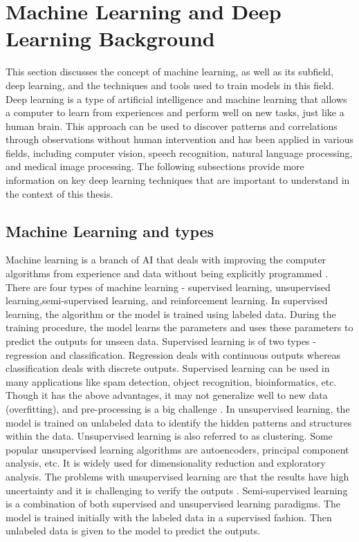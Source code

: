 \documentclass{book}
\begin{document}
	\section{Machine Learning and Deep Learning Background}
	This section discusses the concept of machine learning, as well as its subfield, deep learning, and the techniques and tools used to train models in this field. Deep learning is a type of artificial intelligence and machine learning that allows a computer to learn from experiences and perform well on new tasks, just like a human brain. This approach can be used to discover patterns and correlations through observations without human intervention and has been applied in various fields, including computer vision, speech recognition, natural language processing, and medical image processing. The following subsections provide more information on key deep learning techniques that are important to understand in the context of this thesis.
	
	\subsection{Machine Learning and types}
	Machine learning is a branch of AI that deals with improving the computer algorithms from experience and data without being explicitly programmed \cite{koza1996automated}. There	are four types of machine learning - supervised learning, unsupervised learning,semi-supervised learning, and reinforcement learning.
	In supervised learning, the algorithm or the model is trained using labeled data.
	During the training procedure, the model learns the parameters and uses these parameters to predict the outputs for unseen data. Supervised learning is of two types - regression and classification. Regression deals with continuous outputs whereas classification deals with discrete outputs. Supervised learning can be used in many applications like spam detection, object recognition, bioinformatics, etc. Though it has the above advantages, it may not generalize well to new data (overfitting), and pre-processing is a big challenge \cite{suplngdetails}.
	In unsupervised learning, the model is trained on unlabeled data to identify the
	hidden patterns and structures within the data. Unsupervised learning is also referred to as clustering. Some popular unsupervised learning algorithms are autoencoders, principal component analysis, etc. It is widely used for dimensionality reduction and exploratory analysis. The problems with unsupervised learning are that the results have high uncertainty and it is challenging to verify the outputs \cite{unsuplngdetails}.
	Semi-supervised learning is a combination of both supervised and unsupervised
	learning paradigms. The model is trained initially with the labeled data in a supervised fashion. Then unlabeled data is given to the model to predict the outputs.
	
\end{document}
